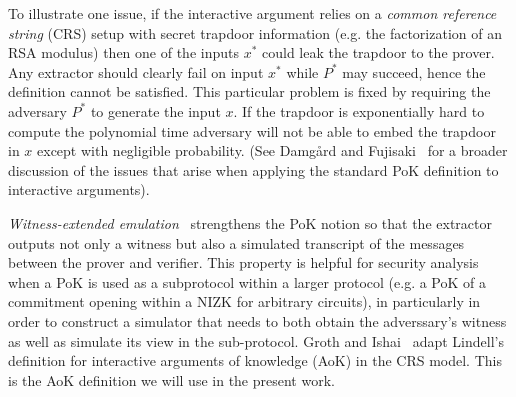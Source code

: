 \documentclass{article}
\theoremstyle{definition}
\begin{document}
To illustrate one issue, if the interactive argument relies on a \emph{common reference string} (CRS) setup with secret trapdoor information (e.g. the factorization of an RSA modulus) then one of the inputs $x^*$ could leak the trapdoor to the prover. Any extractor should clearly fail on input $x^*$ while $P^*$ may succeed, hence the definition cannot be satisfied. This particular problem is fixed by requiring the adversary $P^*$ to generate the input $x$. If the trapdoor is exponentially hard to compute the polynomial time adversary will not be able to embed the trapdoor in $x$ except with negligible probability. (See Damg\r{a}rd and Fujisaki~\cite{AC:DamFuj02} for a broader discussion of the issues that arise when applying the standard PoK definition to interactive arguments).

\emph{Witness-extended emulation}~\cite{EC:Lindell03} strengthens the PoK notion so that the extractor outputs not only a witness but also a simulated transcript of the messages between the prover and verifier. This property is helpful for security analysis when a PoK is used as a subprotocol within a larger protocol (e.g. a PoK of a commitment opening within a NIZK for arbitrary circuits), in particularly in order to construct a simulator that needs to both obtain the adverssary's witness as well as simulate its view in the sub-protocol. Groth and Ishai~\cite{EC:GroIsh08} adapt Lindell's definition for interactive arguments of knowledge (AoK) in the CRS model. This is the AoK definition we will use in the present work.
\end{document}
